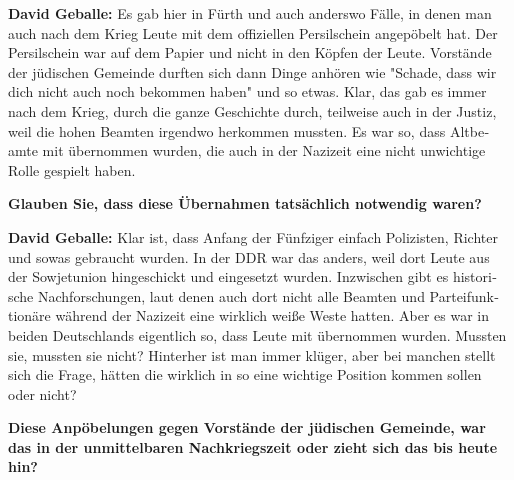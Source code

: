 \begin{otherlanguage}{ngerman}
\textbf{David Geballe:} Es gab hier in Fürth und auch anderswo Fälle, in denen man auch nach dem Krieg Leute mit dem offiziellen Persilschein angepöbelt hat. Der Persilschein war auf dem Papier und nicht in den Köpfen der Leute. Vorstände der jüdischen Gemeinde durften sich dann Dinge anhören wie "Schade, dass wir dich nicht auch noch bekommen haben" und so etwas. Klar, das gab es immer nach dem Krieg, durch die ganze Geschichte durch, teilweise auch in der Justiz, weil die hohen Beamten irgendwo herkommen mussten. Es war so, dass Altbeamte mit übernommen wurden, die auch in der Nazizeit eine nicht unwichtige Rolle gespielt haben. 

\textbf{Glauben Sie, dass diese Übernahmen tatsächlich notwendig waren?} 

\textbf{David Geballe:} Klar ist, dass Anfang der Fünfziger einfach Polizisten, Richter und sowas gebraucht wurden. In der DDR war das anders, weil dort Leute aus der Sowjetunion hingeschickt und eingesetzt wurden. Inzwischen gibt es historische Nachforschungen, laut denen auch dort nicht alle Beamten und Parteifunktionäre während der Nazizeit eine wirklich weiße Weste hatten. Aber es war in beiden Deutschlands eigentlich so, dass Leute mit übernommen wurden. Mussten sie, mussten sie nicht? Hinterher ist man immer klüger, aber bei manchen stellt sich die Frage, hätten die wirklich in so eine wichtige Position kommen sollen oder nicht? 

\textbf{Diese Anpöbelungen gegen Vorstände der jüdischen Gemeinde, war das in der unmittelbaren Nachkriegszeit oder zieht sich das bis heute hin?} 


\end{otherlanguage}
